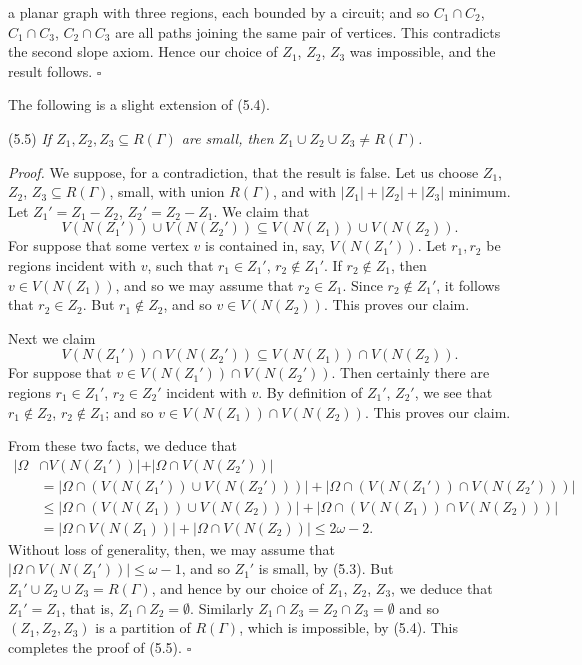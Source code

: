 \noindent a planar graph with three regions, each bounded by a circuit; and so $C_1 \cap C_2$, $C_1 \cap C_3$, $C_2 \cap C_3$ are all paths joining the same pair of vertices. This contradicts the second slope axiom. Hence our choice of $Z_1$, $Z_2$, $Z_3$ was impossible, and the result follows. $\square$

The following is a slight extension of (5.4).

\stmt
(5.5) \textit{If $Z_1, Z_2, Z_3 \subseteq R(\Gamma)$ are small, then $Z_1 \cup Z_2 \cup Z_3 \ne R(\Gamma)$.}

\textit{Proof.} We suppose, for a contradiction, that the result is false. Let us choose $Z_1$, $Z_2$, $Z_3 \subseteq R(\Gamma)$, small, with union $R(\Gamma)$, and with $|Z_1| + |Z_2| + |Z_3|$ minimum. Let $Z_1' = Z_1 - Z_2$, $Z_2' = Z_2 - Z_1$. We claim that
\begin{equation*}
V(N(Z_1')) \cup V(N(Z_2')) \subseteq V(N(Z_1)) \cup V(N(Z_2)).
\end{equation*}
For suppose that some vertex $v$ is contained in, say, $V(N(Z_1'))$. Let $r_1, r_2$ be regions incident with $v$, such that $r_1 \in Z_1'$, $r_2 \notin Z_1'$. If $r_2 \notin Z_1$, then $v \in V(N(Z_1))$, and so we may assume that $r_2 \in Z_1$. Since $r_2 \notin Z_1'$, it follows that $r_2 \in Z_2$. But $r_1 \notin Z_2$, and so $v \in V(N(Z_2))$. This proves our claim.

Next we claim
\begin{equation*}
V(N(Z_1')) \cap V(N(Z_2')) \subseteq V(N(Z_1)) \cap V(N(Z_2)).
\end{equation*}
For suppose that $v \in V(N(Z_1')) \cap V(N(Z_2'))$. Then certainly there are regions $r_1 \in Z_1'$, $r_2 \in Z_2'$ incident with $v$. By definition of $Z_1'$, $Z_2'$, we see that $r_1 \notin Z_2$, $r_2 \notin Z_1$; and so $v \in V(N(Z_1)) \cap V(N(Z_2))$. This proves our claim.

From these two facts, we deduce that
\begin{align*}
|\Omega &\cap V(N(Z_1'))| + |\Omega \cap V(N(Z_2'))| \\
&= |\Omega \cap (V(N(Z_1')) \cup V(N(Z_2')))| + |\Omega \cap (V(N(Z_1')) \cap V(N(Z_2')))| \\
&\le |\Omega \cap (V(N(Z_1)) \cup V(N(Z_2)))| + |\Omega \cap (V(N(Z_1)) \cap V(N(Z_2)))| \\
&= |\Omega \cap V(N(Z_1))| + |\Omega \cap V(N(Z_2))| \le 2\omega - 2.
\end{align*}
Without loss of generality, then, we may assume that $|\Omega \cap V(N(Z_1'))| \le \omega - 1$, and so $Z_1'$ is small, by (5.3). But $Z_1' \cup Z_2 \cup Z_3 = R(\Gamma)$, and hence by our choice of $Z_1$, $Z_2$, $Z_3$, we deduce that $Z_1' = Z_1$, that is, $Z_1 \cap Z_2 = \emptyset$. Similarly $Z_1 \cap Z_3 = Z_2 \cap Z_3 = \emptyset$ and so $(Z_1, Z_2, Z_3)$ is a partition of $R(\Gamma)$, which is impossible, by (5.4). This completes the proof of (5.5). $\square$

